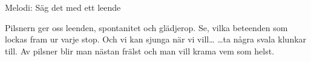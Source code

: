 \begin{song}

\begin{songmeta}
Melodi: Säg det med ett leende
\end{songmeta}

\begin{songtext}
Pilsnern ger oss leenden,
spontanitet och glädjerop.
Se, vilka beteenden som lockas
fram ur varje stop.
Och vi kan sjunga när vi vill\ldots
\ldots{}ta några svala klunkar till.
Av pilsner blir man nästan frälst
och man vill krama vem som helst.
\end{songtext}
\end{song}
